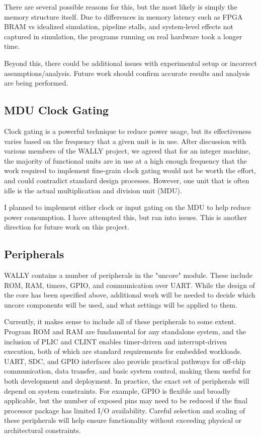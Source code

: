 \documentclass[conference]{IEEEtran}
\begin{document}
There are several possible reasons for this, but the most likely is simply the memory structure itself. Due to differences in memory latency such as FPGA BRAM vs idealized simulation, pipeline stalls, and system-level effects not captured in simulation, the programs running on real hardware took a longer time.

Beyond this, there could be additional issues with experimental setup or incorrect assumptions/analysis. Future work should confirm accurate results and analysis are being performed.


\subsection{MDU Clock Gating}

Clock gating is a powerful technique to reduce power usage, but its effectiveness varies based on the frequency that a given unit is in use. After discussion with various members of the WALLY project, we agreed that for an integer machine, the majority of functional units are in use at a high enough frequency that the work required to implement fine-grain clock gating would not be worth the effort, and could contradict standard design processes. However, one unit that is often idle is the actual multiplication and division unit (MDU). 

I planned to implement either clock or input gating on the MDU to help reduce power consumption. I have attempted this, but ran into issues. This is another direction for future work on this project.

\subsection{Peripherals}
WALLY contains a number of peripherals in the "uncore" module. These include ROM, RAM, timers, GPIO, and communication over UART. While the design of the core has been specified above, additional work will be needed to decide which uncore components will be used, and what settings will be applied to them.

Currently, it makes sense to include all of these peripherals to some extent. Program ROM and RAM are fundamental for any standalone system, and the inclusion of PLIC and CLINT enables timer-driven and interrupt-driven execution, both of which are standard requirements for embedded workloads. UART, SDC, and GPIO interfaces also provide practical pathways for off-chip communication, data transfer, and basic system control, making them useful for both development and deployment. In practice, the exact set of peripherals will depend on system constraints. For example, GPIO is flexible and broadly applicable, but the number of exposed pins may need to be reduced if the final processor package has limited I/O availability. Careful selection and scaling of these peripherals will help ensure functionality without exceeding physical or architectural constraints.
\end{document}

